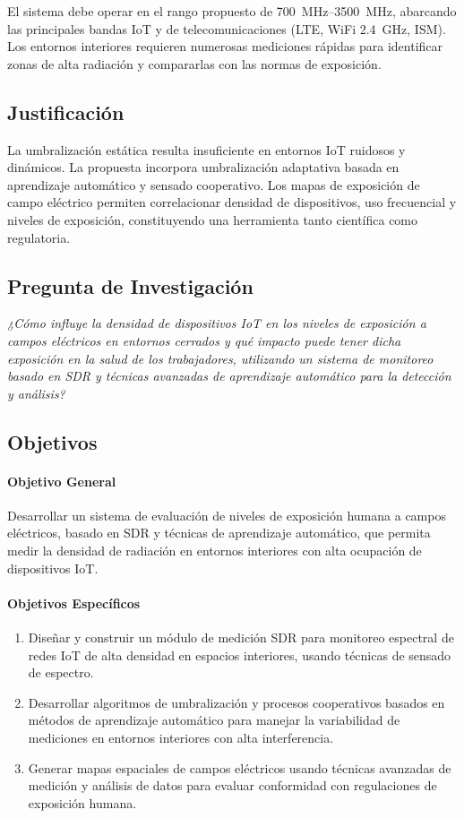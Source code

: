 \documentclass[12pt,a4paper]{article}
\begin{document}
El sistema debe operar en el rango propuesto de \qtyrange{700}{3500}{\MHz}, abarcando las principales bandas IoT y de telecomunicaciones (LTE, WiFi 2.4~GHz, ISM). Los entornos interiores requieren numerosas mediciones rápidas para identificar zonas de alta radiación y compararlas con las normas de exposición.

\subsection{Justificación}

La umbralización estática resulta insuficiente en entornos IoT ruidosos y dinámicos. La propuesta incorpora umbralización adaptativa basada en aprendizaje automático y sensado cooperativo. Los mapas de exposición de campo eléctrico permiten correlacionar densidad de dispositivos, uso frecuencial y niveles de exposición, constituyendo una herramienta tanto científica como regulatoria.

\subsection{Pregunta de Investigación}

\noindent
\textit{¿Cómo influye la densidad de dispositivos IoT en los niveles de exposición a campos eléctricos en entornos cerrados y qué impacto puede tener dicha exposición en la salud de los trabajadores, utilizando un sistema de monitoreo basado en SDR y técnicas avanzadas de aprendizaje automático para la detección y análisis?}

\subsection{Objetivos}

\paragraph{Objetivo General}
Desarrollar un sistema de evaluación de niveles de exposición humana a campos eléctricos, basado en SDR y técnicas de aprendizaje automático, que permita medir la densidad de radiación en entornos interiores con alta ocupación de dispositivos IoT.

\paragraph{Objetivos Específicos}
\begin{enumerate}[label=OE\arabic*:,leftmargin=2.5em]
  \item Diseñar y construir un módulo de medición SDR para monitoreo espectral de redes IoT de alta densidad en espacios interiores, usando técnicas de sensado de espectro.
  \item Desarrollar algoritmos de umbralización y procesos cooperativos basados en métodos de aprendizaje automático para manejar la variabilidad de mediciones en entornos interiores con alta interferencia.
  \item Generar mapas espaciales de campos eléctricos usando técnicas avanzadas de medición y análisis de datos para evaluar conformidad con regulaciones de exposición humana.
\end{enumerate}
\end{document}
